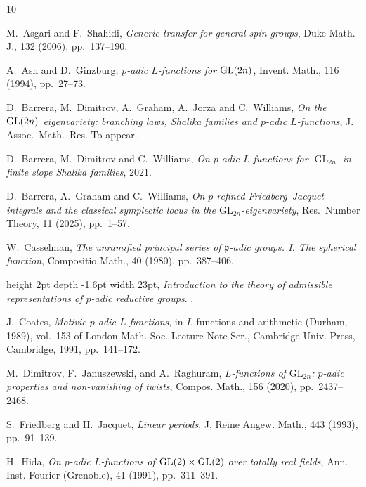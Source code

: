 \begin{thebibliography}{10}


{\sc M.~Asgari and F.~Shahidi}, {\em Generic transfer for general spin groups},
  Duke Math. J., 132 (2006), pp.~137--190.

{\sc A.~Ash and D.~Ginzburg}, {\em {$p$}-adic {$L$}-functions for {${\rm
  GL}(2n)$}}, Invent. Math., 116 (1994), pp.~27--73.

{\sc D.~Barrera, M.~Dimitrov, A.~Graham, A.~Jorza and C.~Williams},
  {\em On the ${\rm GL}(2n)$ eigenvariety: branching laws, {S}halika families and
  $p$-adic ${L}$-functions}, J. Assoc.\ Math.\ Res.
\newblock To appear.


{\sc D.~Barrera, M.~Dimitrov and C.~Williams}, {\em On $p$-adic
  $L$-functions for $\operatorname{GL}_{2n}$ in finite slope Shalika families}, 2021.

{\sc D.~Barrera, A.~Graham and C.~Williams}, {\em On $p$-refined
  {F}riedberg--{J}acquet integrals and the classical symplectic locus in the
  {$\mathrm{GL}_{2n}$}-eigenvariety}, Res.\ Number Theory, 11 (2025),
  pp.~1--57.


{\sc W.~Casselman}, {\em The unramified principal series of
  {$\mathfrak{p}$}-adic groups. {I}. {T}he spherical function}, Compositio
  Math., 40 (1980), pp.~387--406.

\leavevmode\vrule height 2pt depth -1.6pt width 23pt, {\em Introduction to the
  theory of admissible representations of $p$-adic reductive groups}.
.

{\sc J.~Coates}, {\em Motivic {$p$}-adic {$L$}-functions}, in {$L$}-functions
  and arithmetic ({D}urham, 1989), vol.~153 of London Math. Soc. Lecture Note
  Ser., Cambridge Univ. Press, Cambridge, 1991, pp.~141--172.

{\sc M.~Dimitrov, F.~Januszewski, and A.~Raghuram}, {\em {$L$}-functions of
  {$\mathrm{GL}_{2n}$}: {$p$}-adic properties and non-vanishing of twists},
  Compos. Math., 156 (2020), pp.~2437--2468.

{\sc S.~Friedberg and H.~Jacquet}, {\em Linear periods}, J. Reine Angew. Math.,
  443 (1993), pp.~91--139.

{\sc H.~Hida}, {\em On {$p$}-adic {$L$}-functions of {${\rm GL}(2)\times {\rm
  GL}(2)$} over totally real fields}, Ann. Inst. Fourier (Grenoble), 41 (1991),
  pp.~311--391.


\end{thebibliography}

